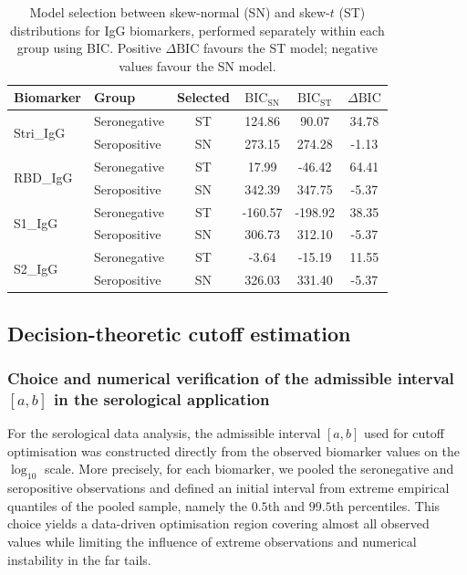 \documentclass[11pt,a4paper]{article}
\theoremstyle{definition}
\theoremstyle{remark}
\newcommand{\1}{\mathbf{1}}
\begin{document}
\begin{table}[ht]
\centering
\caption{Model selection between skew-normal (SN) and skew-$t$ (ST)
distributions for IgG biomarkers, performed separately within each group
using BIC. Positive $\Delta\mathrm{BIC}$ favours the ST model; negative
values favour the SN model.}
\label{tab:model-selection-igg}
\small
\begin{tabular}{@{}llcccc@{}}
\toprule
\textbf{Biomarker} & \textbf{Group} & \textbf{Selected} &
  $\mathrm{BIC}_\mathrm{SN}$ & $\mathrm{BIC}_\mathrm{ST}$ &
  $\Delta\mathrm{BIC}$ \\
\midrule
\multirow{2}{*}{Stri\_IgG}
& Seronegative & ST &  124.86 &  90.07 & 34.78 \\
& Seropositive & SN &  273.15 & 274.28 & -1.13 \\
\midrule
\multirow{2}{*}{RBD\_IgG}
& Seronegative & ST &   17.99 & -46.42 & 64.41 \\
& Seropositive & SN &  342.39 & 347.75 & -5.37 \\
\midrule
\multirow{2}{*}{S1\_IgG}
& Seronegative & ST & -160.57 & -198.92 & 38.35 \\
& Seropositive & SN &  306.73 &  312.10 & -5.37 \\
\midrule
\multirow{2}{*}{S2\_IgG}
& Seronegative & ST &   -3.64 &  -15.19 & 11.55 \\
& Seropositive & SN &  326.03 &  331.40 & -5.37 \\
\bottomrule
\end{tabular}
\end{table}

\subsection{Decision-theoretic cutoff estimation}
\label{sec:decision-theoretic-cutoff-estimation}

\subsubsection{Choice and numerical verification of the admissible interval \texorpdfstring{$[a,b]$}{[a,b]} in the serological application}
For the serological data analysis, the admissible interval $[a,b]$
used for cutoff optimisation was constructed directly from the
observed biomarker values on the $\log_{10}$ scale. More precisely,
for each biomarker, we pooled the seronegative and seropositive
observations and defined an initial interval from extreme empirical
quantiles of the pooled sample, namely the $0.5$th and $99.5$th
percentiles. This choice yields a data-driven optimisation region
covering almost all observed values while limiting the influence of
extreme observations and numerical instability in the far tails.
\end{document}
